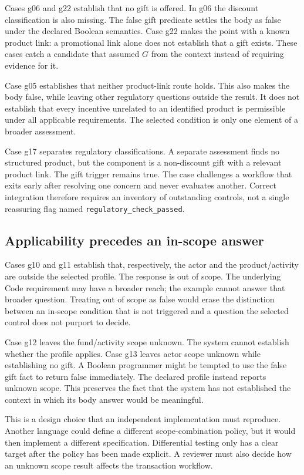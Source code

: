 Cases g06 and g22 establish that no gift is offered. In g06 the discount
classification is also missing. The false gift predicate settles the body as
false under the declared Boolean semantics. Case g22 makes the point with a
known product link: a promotional link alone does not establish that a gift
exists. These cases catch a candidate that assumed $G$ from the context instead
of requiring evidence for it.

Case g05 establishes that neither product-link route holds. This also makes the
body false, while leaving other regulatory questions outside the result. It
does not establish that every incentive unrelated to an identified product is
permissible under all applicable requirements. The selected condition is only
one element of a broader assessment.

Case g17 separates regulatory classifications. A separate assessment finds no
structured product, but the component is a non-discount gift with a relevant
product link. The gift trigger remains true. The case challenges a workflow
that exits early after resolving one concern and never evaluates another.
Correct integration therefore requires an inventory of outstanding controls,
not a single reassuring flag named \texttt{regulatory\_check\_passed}.

\subsection{Applicability precedes an in-scope answer}
Cases g10 and g11 establish that, respectively, the actor and the product/activity
are outside the selected profile. The response is out of scope. The underlying
Code requirement may have a broader reach; the example cannot answer that
broader question. Treating out of scope as false would erase the distinction
between an in-scope condition that is not triggered and a question the selected
control does not purport to decide.

Case g12 leaves the fund/activity scope unknown. The system cannot establish
whether the profile applies. Case g13 leaves actor scope unknown while
establishing no gift. A Boolean programmer might be tempted to use the false
gift fact to return false immediately. The declared profile instead reports
unknown scope. This preserves the fact that the system has not established the
context in which its body answer would be meaningful.

This is a design choice that an independent implementation must reproduce.
Another language could define a different scope-combination policy, but it
would then implement a different specification. Differential testing only has
a clear target after the policy has been made explicit. A reviewer must also
decide how an unknown scope result affects the transaction workflow.

